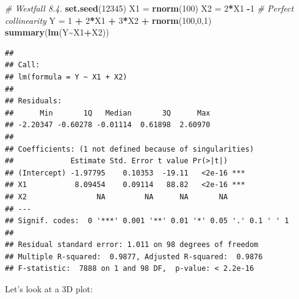 \documentclass[
]{book}
\newenvironment{Shaded}{\begin{snugshade}}{\end{snugshade}}
\newcommand{\CommentTok}[1]{\textcolor[rgb]{0.56,0.35,0.01}{\textit{#1}}}
\newcommand{\DecValTok}[1]{\textcolor[rgb]{0.00,0.00,0.81}{#1}}
\newcommand{\FunctionTok}[1]{\textcolor[rgb]{0.13,0.29,0.53}{\textbf{#1}}}
\newcommand{\NormalTok}[1]{#1}
\newcommand{\OtherTok}[1]{\textcolor[rgb]{0.56,0.35,0.01}{#1}}
\newcommand{\SpecialCharTok}[1]{\textcolor[rgb]{0.81,0.36,0.00}{\textbf{#1}}}
\begin{document}
\begin{Shaded}
\begin{Highlighting}[]
\CommentTok{\# Westfall 8.4.}
\FunctionTok{set.seed}\NormalTok{(}\DecValTok{12345}\NormalTok{)}
\NormalTok{X1 }\OtherTok{=} \FunctionTok{rnorm}\NormalTok{(}\DecValTok{100}\NormalTok{)}
\NormalTok{X2 }\OtherTok{=} \DecValTok{2}\SpecialCharTok{*}\NormalTok{X1 }\SpecialCharTok{{-}}\DecValTok{1}     \CommentTok{\# Perfect collinearity}
\NormalTok{Y }\OtherTok{=} \DecValTok{1} \SpecialCharTok{+} \DecValTok{2}\SpecialCharTok{*}\NormalTok{X1 }\SpecialCharTok{+} \DecValTok{3}\SpecialCharTok{*}\NormalTok{X2 }\SpecialCharTok{+} \FunctionTok{rnorm}\NormalTok{(}\DecValTok{100}\NormalTok{,}\DecValTok{0}\NormalTok{,}\DecValTok{1}\NormalTok{)}
\FunctionTok{summary}\NormalTok{(}\FunctionTok{lm}\NormalTok{(Y}\SpecialCharTok{\textasciitilde{}}\NormalTok{X1}\SpecialCharTok{+}\NormalTok{X2))}
\end{Highlighting}
\end{Shaded}

\begin{verbatim}
## 
## Call:
## lm(formula = Y ~ X1 + X2)
## 
## Residuals:
##      Min       1Q   Median       3Q      Max 
## -2.20347 -0.60278 -0.01114  0.61898  2.60970 
## 
## Coefficients: (1 not defined because of singularities)
##             Estimate Std. Error t value Pr(>|t|)    
## (Intercept) -1.97795    0.10353  -19.11   <2e-16 ***
## X1           8.09454    0.09114   88.82   <2e-16 ***
## X2                NA         NA      NA       NA    
## ---
## Signif. codes:  0 '***' 0.001 '**' 0.01 '*' 0.05 '.' 0.1 ' ' 1
## 
## Residual standard error: 1.011 on 98 degrees of freedom
## Multiple R-squared:  0.9877, Adjusted R-squared:  0.9876 
## F-statistic:  7888 on 1 and 98 DF,  p-value: < 2.2e-16
\end{verbatim}

Let's look at a 3D plot:
\end{document}
